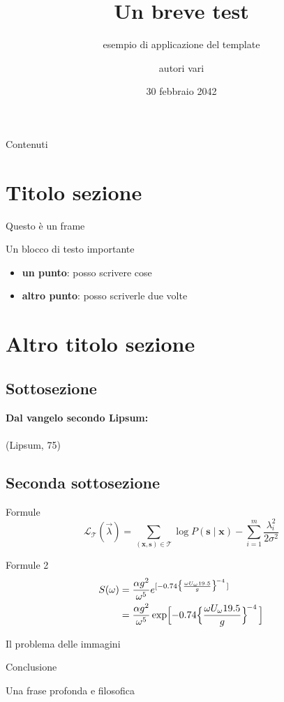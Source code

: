 \documentclass{beamer}
\title{Un breve test}
\subtitle{esempio di applicazione del template}
\author{autori vari}
\institute{Università di Trento}
\date{30 febbraio 2042}
\begin{document}
\begin{frame}
  \titlepage
\end{frame}

\begin{frame}{Contenuti}
  \tableofcontents
\end{frame}

\section{Titolo sezione}

\begin{frame}{Questo è un frame}
    \begin{block}{Un blocco di testo importante}
        \lipsum[66]
    \end{block}
    \pause
    \begin{itemize}
      \item \textbf{un punto}: posso scrivere cose
      \pause
      \item \textbf{altro punto}: posso scriverle due volte
    \end{itemize}
\end{frame}

\section{Altro titolo sezione}
\subsection{Sottosezione}

\begin{frame}{}
    \textbf{Dal vangelo secondo Lipsum:} \\
    \pause
    \textit{\lipsum[75]} \\ 
    (Lipsum, 75)
\end{frame}

\subsection{Seconda sottosezione}

\begin{frame}{Formule}
    \[
    \mathcal L_{\mathcal T}(\vec{\lambda})
    = \sum_{(\mathbf{x},\mathbf{s})\in \mathcal T}
       \log P(\mathbf{s}\mid\mathbf{x}) - \sum_{i=1}^m
       \frac{\lambda_i^2}{2\sigma^2}
    \]
\end{frame}

\begin{frame}{Formule 2}
    \begin{align*}
        S(\omega) 
        &= \frac{\alpha g^2}{\omega^5} e^{[ -0.74\bigl\{\frac{\omega U_\omega         19.5}{g}\bigr\}^{\!-4}\,]} \\
        &= \frac{\alpha g^2}{\omega^5} \exp\Bigl[ -0.74\Bigl\{\frac{\omega       U_\omega 19.5}{g}\Bigr\}^{\!-4}\,\Bigr] 
    \end{align*}
\end{frame}


\begin{frame}{Il problema delle immagini}
\end{frame}

\begin{frame}{Conclusione}
    \begin{alertblock}{Una frase profonda e filosofica}
        \lipsum[66]
    \end{alertblock}
\end{frame}
\end{document}
